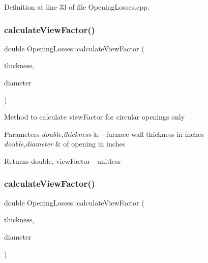 Definition at line 33 of file Opening\+Losses.\+cpp.

\mbox{\label{class_opening_losses_aa8ffc249e49ee7f8413f32f7e803524a}} 
\subsubsection{\texorpdfstring{calculate\+View\+Factor()}{calculateViewFactor()}\hspace{0.1cm}{\footnotesize\ttfamily [2/6]}}
{\footnotesize\ttfamily double Opening\+Losses\+::calculate\+View\+Factor (\begin{DoxyParamCaption}\item[{double}]{thickness,  }\item[{double}]{diameter }\end{DoxyParamCaption})}

Method to calculate view\+Factor for circular openings only 
\begin{DoxyParams}{Parameters}
{\em double,thickness} & -\/ furnace wall thickness in inches \\
\hline
{\em double,diameter} & of opening in inches \\
\hline
\end{DoxyParams}
\begin{DoxyReturn}{Returns}
double, view\+Factor -\/ unitless 
\end{DoxyReturn}
\mbox{\label{class_opening_losses_aa8ffc249e49ee7f8413f32f7e803524a}} 
\subsubsection{\texorpdfstring{calculate\+View\+Factor()}{calculateViewFactor()}\hspace{0.1cm}{\footnotesize\ttfamily [3/6]}}
{\footnotesize\ttfamily double Opening\+Losses\+::calculate\+View\+Factor (\begin{DoxyParamCaption}\item[{double}]{thickness,  }\item[{double}]{diameter }\end{DoxyParamCaption})}

